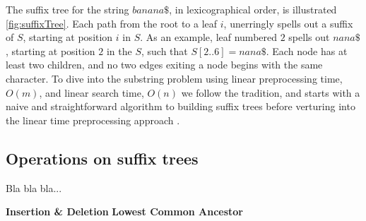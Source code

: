 \documentclass[12pt]{article} %
\begin{document}
The suffix tree for the string $banana\$$, in lexicographical order, is illustrated \ref{fig:suffixTree}. Each path from the root to a leaf $i$, unerringly spells out a suffix of $S$, starting at position $i$ in $S$. As an example, leaf numbered $2$ spells out $nana\$$, starting at position $2$ in the $S$, such that $S[2..6] = nana\$$. Each node has at least two children, and no two edges exiting a node begins with the same character. 
\newline
To dive into the substring problem using linear preprocessing time, $O(m)$, and linear search time, $O(n)$ we follow the tradition, and starts with a naive and straightforward algorithm to building suffix trees before verturing into the linear time preprocessing approach \cite{gusfield}. 

\subsection{Operations on suffix trees}

Bla bla bla...
\newline

\textbf{Insertion \& Deletion}
\textbf{Lowest Common Ancestor}
\end{document}
